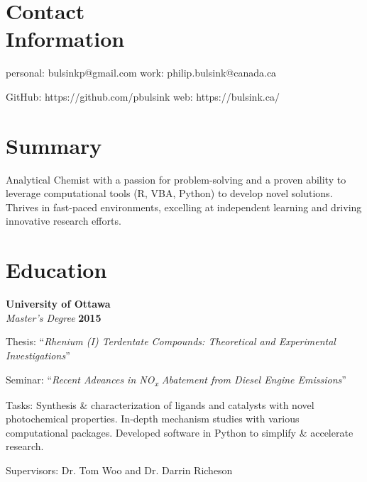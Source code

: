 \documentclass[margin,line]{resumecls}
\begin{document}
\thispagestyle{plain}
\begin{resume}

    \section{\mysidestyle Contact\\Information}

    personal: bulsinkp@gmail.com \hfill work: philip.bulsink@canada.ca%
    \vspace{-4.5mm}

    GitHub: https://github.com/pbulsink \hfill web: https://bulsink.ca/%
    \\\vspace{-4.5mm}

    \section{\mysidestyle Summary}

    Analytical Chemist with a passion for problem-solving and a proven ability to leverage computational tools (R, VBA, Python) to develop novel solutions.
    Thrives in fast-paced environments, excelling at independent learning and driving innovative research efforts.


    \section{\mysidestyle Education}

    \textbf{University of Ottawa}\\\vspace{1mm}%
    \textsl{Master's Degree} \hfill \textbf{2015}\vspace{-3mm}\\\vspace{-1mm}%
    \begin{list2}
        \item Thesis: ``\textit{Rhenium (I) Terdentate Compounds: Theoretical and Experimental Investigations}''
        \item Seminar: ``\textit{Recent Advances in NO\textsubscript{x} Abatement from Diesel Engine Emissions}''
        \item Tasks: Synthesis \& characterization of ligands and catalysts with novel photochemical properties.
        In-depth mechanism studies with various computational packages.
        Developed software in Python to simplify \& accelerate research.
        \item Supervisors: Dr. Tom Woo and Dr. Darrin Richeson
    \end{list2}


\end{resume}
\end{document}
